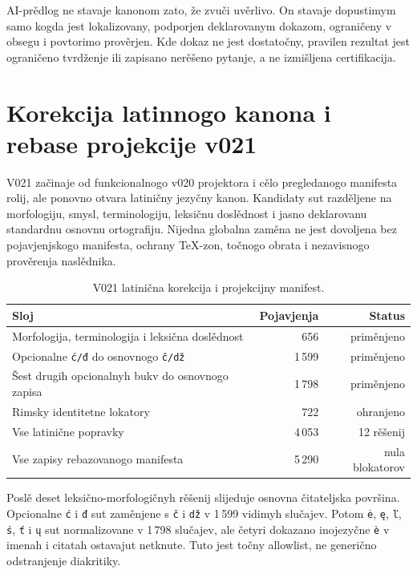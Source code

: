 \documentclass[11pt]{article}
\newcommand{\code}[1]{\texttt{#1}}
\begin{document}
AI-prědlog ne stavaje kanonom zato, že zvuči uvěrlivo. On stavaje dopustimym samo kogda jest lokalizovany, podporjen deklarovanym dokazom, ograničeny v obsegu i povtorimo prověrjen. Kde dokaz ne jest dostatočny, pravilen rezultat jest ograničeno tvrdženje ili zapisano nerěšeno pytanje, a ne izmišljena certifikacija.

\section{Korekcija latinnogo kanona i rebase projekcije v021}

V021 začinaje od funkcionalnogo v020 projektora i cělo pregledanogo manifesta rolij, ale ponovno otvara latiničny jezyčny kanon. Kandidaty sut razděljene na morfologiju, smysl, terminologiju, leksičnu doslědnost i jasno deklarovanu standardnu osnovnu ortografiju. Nijedna globalna zaměna ne jest dovoljena bez pojavjenjskogo manifesta, ochrany TeX-zon, točnogo obrata i nezavisnogo prověrenja naslědnika.

\begin{table}[ht]
\centering
\caption{V021 latinična korekcija i projekcijny manifest.}\label{tab:isv-review}
\begin{tabular}{@{}lrr@{}}
\toprule
Sloj & Pojavjenja & Status\\
\midrule
Morfologija, terminologija i leksična doslědnost & 656 & priměnjeno\\
Opcionalne \code{ć/đ} do osnovnogo \code{č/dž} & 1\,599 & priměnjeno\\
Šest drugih opcionalnyh bukv do osnovnogo zapisa & 1\,798 & priměnjeno\\
Rimsky identitetne lokatory & 722 & ohranjeno\\
\midrule
Vse latinične popravky & 4\,053 & 12 rěšenij\\
Vse zapisy rebazovanogo manifesta & 5\,290 & nula blokatorov\\
\bottomrule
\end{tabular}
\end{table}

Poslě deset leksično-morfologičnyh rěšenij slijeduje osnovna čitateljska površina. Opcionalne \code{ć} i \code{đ} sut zaměnjene s \code{č} i \code{dž} v 1\,599 vidimyh slučajev. Potom \code{ė}, \code{ę}, \code{ľ}, \code{ś}, \code{ť} i \code{ų} sut normalizovane v 1\,798 slučajev, ale četyri dokazano inojezyčne \code{è} v imenah i citatah ostavajut netknute. Tuto jest točny allowlist, ne generično odstranjenje diakritiky.
\end{document}
